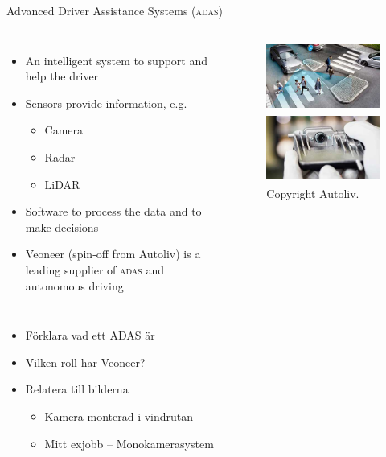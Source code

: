 \documentclass{beamer}
\newcommand{\adas}{\textsc{adas}\xspace}
\newcommand{\eg}{e.g.\xspace}
\renewcommand{\aa}{\"a\xspace}
\renewcommand{\o}{\"o\xspace}
\begin{document}
\begin{frame}{Advanced Driver Assistance Systems (\adas)}
	\begin{columns}
	\begin{itemize}
		\item An intelligent system to support and help the driver
		\item Sensors provide information, \eg
		\begin{itemize}
			\item Camera
			\item Radar
			\item LiDAR
		\end{itemize}
		\item Software to process the data and to make decisions
		\item Veoneer (spin-off from Autoliv) is a leading supplier of \adas and autonomous driving
	\end{itemize}
		\begin{figure}
			\includegraphics[height=2.25cm]{fig/ALV_People-crossing_Zebra-with-cars+detection_0}

			\vspace{0.5em}

			\includegraphics[height=2.25cm]{fig/ALV_Mono-Vision-Sensor}
			\caption{Copyright Autoliv.}
		\end{figure}
	\end{columns}

	\note
	{
		\begin{itemize}
			\item F\o{}rklara vad ett ADAS \aa{}r
			\item Vilken roll har Veoneer?
			\item Relatera till bilderna
            \begin{itemize}
                \item Kamera monterad i vindrutan
                \item Mitt exjobb -- Monokamerasystem
            \end{itemize}
		\end{itemize}
	}
\end{frame}
\end{document}
